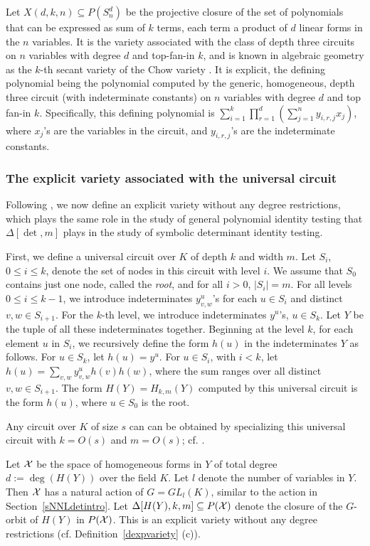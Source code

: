 \documentclass[11pt]{article}
\begin{document}
Let $X(d,k,n) \subseteq P(S^d_n)$ be
the projective closure of the set of polynomials that can be expressed as sum of $k$ terms, each term a product of $d$ linear forms
in the $n$ variables.
It is the  variety associated with the class of  depth three circuits on $n$ variables with degree $d$
and  top-fan-in $k$, and is known in algebraic geometry as the $k$-th secant variety of the Chow variety  \cite{landsberg}. 
It is explicit, the defining polynomial being the polynomial computed by the generic,
homogeneous,  depth three circuit (with 
indeterminate constants) on $n$ variables with degree $d$ and top fan-in $k$. 
Specifically, this defining polynomial 
is $\sum_{i=1}^k \prod_{r=1}^d (\sum_{j=1}^n y_{i,r,j} x_j)$, 
where $x_j$'s are the variables in the 
circuit, and  $y_{i,r,j}$'s are the indeterminate constants. 

\subsubsection{The explicit variety associated with the universal  circuit} \label{shy}
Following \cite{GCT1}, we  now define  an explicit variety without any degree restrictions, which 
plays the same role  in the study of  general polynomial identity testing
that $\Delta[\det,m]$ plays in the study of symbolic determinant identity testing.

First, we  define a universal  circuit over $K$ of depth $k$ and
width $m$. Let $S_i$, $0 \le i \le k$, denote the set of nodes in  this circuit
with level $i$. We assume  that $S_0$ contains just one node, called the {\em root},
and for all $i>0$, $|S_i|=m$.  
For all levels $0\leq i\leq k-1$, we introduce
indeterminates $y_{v,w}^u$'s for each $u\in S_i $ and 
 distinct $v,w\in S_{i+1}$. For the $k$-th level, we introduce  
indeterminates  
$y^u$'s, $u\in S_k $. Let $Y$ be the tuple of all these indeterminates together.
Beginning at the level $k$, for each element 
$u$ in $S_i $, we recursively  define  
the form $h(u)$ in the indeterminates $Y$ as follows.
For  $u\in S_k $, let $h(u)=y^u$. For $u\in S_i $,
with $i<k$, let $h(u) =\sum_{v,w} y^u_{v,w} h(v)h(w) $, where 
the sum ranges over all distinct $v,w \in S_{i+1} $. 
The form $H(Y)=H_{k,m}(Y)$ computed by this universal circuit 
is the form $h(u)$,  where $u\in S_0$ is the root. 

Any circuit over $K$ of size $s$ can 
can be obtained by specializing this  universal 
circuit with $k=O(s)$ and $m=O(s)$; cf. \cite{GCT1}. 

Let ${\cal X}$  be the space of homogeneous forms in $Y$ of total degree $d:=\deg(H(Y))$ over the field $K$. 
Let $l$ denote the number of variables in $Y$. Then ${\cal X}$ has a natural action of $G=GL_l(K)$, similar to the action  in Section~\ref{sNNLdetintro}. 
Let $\Delta[H(Y),k,m] \subseteq P({\cal X})$ denote the closure of the $G$-orbit of $H(Y)$ in $P({\cal X})$.
This  is an explicit variety 
without any degree restrictions (cf. Definition~\ref{dexpvariety} (c)). 
\end{document}
